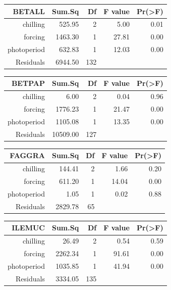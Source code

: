\documentclass{article}\usepackage[]{graphicx}\usepackage[]{color}
\begin{document}
\begin{table}[ht]
\centering
\begin{tabular}{rrrrr}
  \hline
  BETALL & Sum.Sq & Df & F value & Pr(>F) \\
 \hline
chilling & 525.95 &   2 & 5.00 & 0.01 \\ 
  forcing & 1463.30 &   1 & 27.81 & 0.00 \\ 
  photoperiod & 632.83 &   1 & 12.03 & 0.00 \\ 
  Residuals & 6944.50 & 132 &  &  \\ 
   \hline
\end{tabular}
\end{table}
\begin{table}[ht]
\centering
\begin{tabular}{rrrrr}
  \hline
  BETPAP & Sum.Sq & Df & F value & Pr(>F) \\
 \hline
chilling & 6.00 &   2 & 0.04 & 0.96 \\ 
  forcing & 1776.23 &   1 & 21.47 & 0.00 \\ 
  photoperiod & 1105.08 &   1 & 13.35 & 0.00 \\ 
  Residuals & 10509.00 & 127 &  &  \\ 
   \hline
\end{tabular}
\end{table}
\begin{table}[ht]
\centering
\begin{tabular}{rrrrr}
  \hline
  FAGGRA & Sum.Sq & Df & F value & Pr(>F) \\
 \hline
chilling & 144.41 &   2 & 1.66 & 0.20 \\ 
  forcing & 611.20 &   1 & 14.04 & 0.00 \\ 
  photoperiod & 1.05 &   1 & 0.02 & 0.88 \\ 
  Residuals & 2829.78 &  65 &  &  \\ 
   \hline
\end{tabular}
\end{table}
\begin{table}[ht]
\centering
\begin{tabular}{rrrrr}
  \hline
  ILEMUC & Sum.Sq & Df & F value & Pr(>F) \\
 \hline
chilling & 26.49 &   2 & 0.54 & 0.59 \\ 
  forcing & 2262.34 &   1 & 91.61 & 0.00 \\ 
  photoperiod & 1035.85 &   1 & 41.94 & 0.00 \\ 
  Residuals & 3334.05 & 135 &  &  \\ 
   \hline
\end{tabular}
\end{table}
\end{document}
